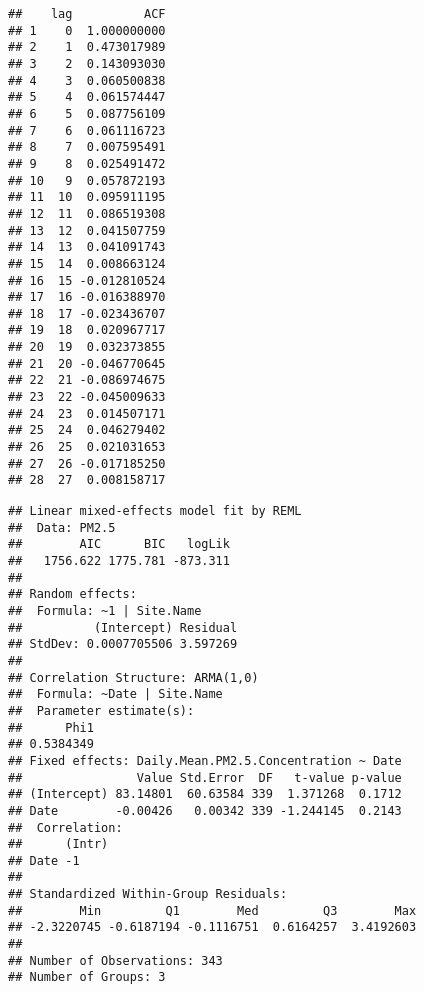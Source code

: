 \documentclass[]{article}
\newenvironment{Shaded}{\begin{snugshade}}{\end{snugshade}}
\newcommand{\KeywordTok}[1]{\textcolor[rgb]{0.13,0.29,0.53}{\textbf{#1}}}
\newcommand{\DataTypeTok}[1]{\textcolor[rgb]{0.13,0.29,0.53}{#1}}
\newcommand{\DecValTok}[1]{\textcolor[rgb]{0.00,0.00,0.81}{#1}}
\newcommand{\FloatTok}[1]{\textcolor[rgb]{0.00,0.00,0.81}{#1}}
\newcommand{\StringTok}[1]{\textcolor[rgb]{0.31,0.60,0.02}{#1}}
\newcommand{\CommentTok}[1]{\textcolor[rgb]{0.56,0.35,0.01}{\textit{#1}}}
\newcommand{\OperatorTok}[1]{\textcolor[rgb]{0.81,0.36,0.00}{\textbf{#1}}}
\newcommand{\NormalTok}[1]{#1}
\begin{document}
\begin{verbatim}
##    lag          ACF
## 1    0  1.000000000
## 2    1  0.473017989
## 3    2  0.143093030
## 4    3  0.060500838
## 5    4  0.061574447
## 6    5  0.087756109
## 7    6  0.061116723
## 8    7  0.007595491
## 9    8  0.025491472
## 10   9  0.057872193
## 11  10  0.095911195
## 12  11  0.086519308
## 13  12  0.041507759
## 14  13  0.041091743
## 15  14  0.008663124
## 16  15 -0.012810524
## 17  16 -0.016388970
## 18  17 -0.023436707
## 19  18  0.020967717
## 20  19  0.032373855
## 21  20 -0.046770645
## 22  21 -0.086974675
## 23  22 -0.045009633
## 24  23  0.014507171
## 25  24  0.046279402
## 26  25  0.021031653
## 27  26 -0.017185250
## 28  27  0.008158717
\end{verbatim}

\begin{Shaded}
\end{Shaded}

\begin{verbatim}
## Linear mixed-effects model fit by REML
##  Data: PM2.5 
##        AIC      BIC   logLik
##   1756.622 1775.781 -873.311
## 
## Random effects:
##  Formula: ~1 | Site.Name
##          (Intercept) Residual
## StdDev: 0.0007705506 3.597269
## 
## Correlation Structure: ARMA(1,0)
##  Formula: ~Date | Site.Name 
##  Parameter estimate(s):
##      Phi1 
## 0.5384349 
## Fixed effects: Daily.Mean.PM2.5.Concentration ~ Date 
##                Value Std.Error  DF   t-value p-value
## (Intercept) 83.14801  60.63584 339  1.371268  0.1712
## Date        -0.00426   0.00342 339 -1.244145  0.2143
##  Correlation: 
##      (Intr)
## Date -1    
## 
## Standardized Within-Group Residuals:
##        Min         Q1        Med         Q3        Max 
## -2.3220745 -0.6187194 -0.1116751  0.6164257  3.4192603 
## 
## Number of Observations: 343
## Number of Groups: 3
\end{verbatim}
\end{document}
